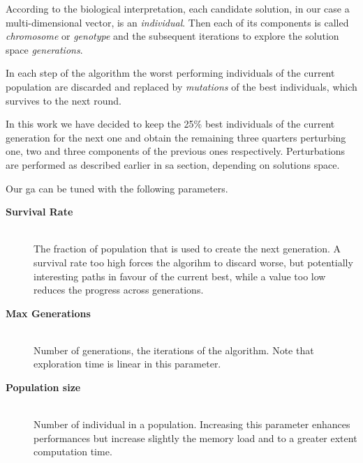 \documentclass[12pt,journal,draftclsnofoot,onecolumn]{IEEEtran}
\begin{document}
According to the biological interpretation, each candidate solution, in our case a multi-dimensional vector, is an \emph{individual}.
Then each of its components is called \emph{chromosome} or \emph{genotype} and the subsequent iterations to explore the solution space \emph{generations}.

In each step of the algorithm the worst performing individuals of the current population are discarded and replaced by \emph{mutations} of the best individuals, which survives to the next round.

In this work we have decided to keep the 25\% best individuals of the current generation for the next one and obtain the remaining three quarters perturbing one, two and three components of the previous ones respectively. Perturbations are performed as described earlier in \gls{sa} section, depending on solutions space.

Our \gls{ga} can be tuned with the following parameters.
\begin{description}
	\item[\textbf{Survival Rate}] \hfill \\
	The fraction of population that is used to create the next generation. A survival rate too high forces the algorihm to discard worse, but potentially interesting paths in favour of the current best, while a value too low reduces the progress across generations.
	\item[\textbf{Max Generations}] \hfill \\
	Number of generations, the iterations of the algorithm. Note that exploration time is linear in this parameter.
	\item[\textbf{Population size}] \hfill \\
	Number of individual in a population. Increasing this parameter enhances performances but increase slightly the memory load and to a greater extent computation time.
\end{description}
\end{document}
